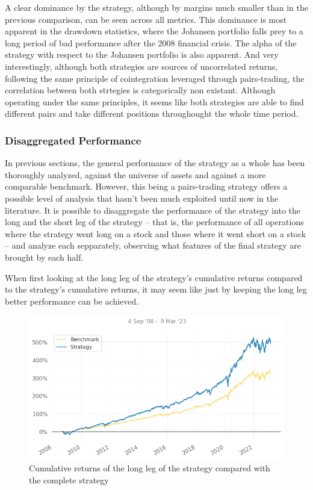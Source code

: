 A clear dominance by the strategy, although by margins much smaller than in the previous comparison, can be seen across all metrics. This dominance is most apparent in the drawdown statistics, where the Johansen portfolio falls prey to a long period of bad performance after the 2008 financial crisis. The alpha of the strategy with respect to the Johansen portfolio is also apparent. And very interestingly, although both strategies are sources of uncorrelated returns, following the same principle of cointegration leveraged through pairs-trading, the correlation between both strtegies is categorically non existant. Although operating under the same principles, it seems like both strategies are able to find different pairs and take different positions throughought the whole time period.

\subsubsection{Disaggregated Performance}
In previous sections, the general performance of the strategy as a whole has been thoroughly analyzed, against the universe of assets and against a more comparable benchmark. However, this being a pairs-trading strategy offers a possible level of analysis that hasn't been much exploited until now in the literature. It is possible to disaggregate the performance of the strategy into the long and the short leg of the strategy -- that is, the performance of all operations where the strategy went long on a stock and those where it went short on a stock -- and analyze each sepparately, observing what features of the final strategy are brought by each half. 

When first looking at the long leg of the strategy's cumulative returns compared to the strategy's cumulative returns, it may seem like just by keeping the long leg better performance can be achieved.

\begin{figure}[ht]
    \includegraphics[width=\linewidth]{assets/long-vs-strat.png}
    \caption{Cumulative returns of the long leg of the strategy compared with the complete strategy}
    \label{fig:long-vs-strat}
\end{figure}

